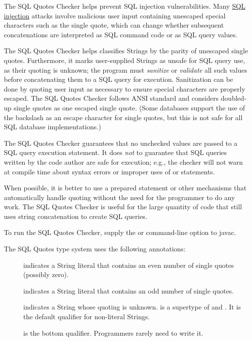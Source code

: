 \htmlhr
{}

The SQL Quotes Checker helps prevent SQL injection vulnerabilities. Many
\href{https://en.wikipedia.org/wiki/Sql_injection}{SQL injection} attacks
involve malicious user input containing unescaped special characters such as the
single quote, which can change whether subsequent concatenations are interpreted
as SQL command code or as SQL query values.

The SQL Quotes Checker helps classifies Strings by the parity of unescaped
single quotes.  Furthermore, it marks user-supplied Strings as unsafe for
SQL query use, as their quoting is unknown; the program must
\emph{sanitize} or \emph{validate} all such values before concatenating
them to a SQL query for execution. Sanitization can be done by quoting user
input as necessary to ensure special characters are properly escaped.  The
SQL Quotes Checker follows ANSI standard and considers doubled-up single
quotes as one escaped single quote.  (Some databases support the use of the
backslash as an escape character for single quotes, but this is not safe
for all SQL database implementations.)

The SQL Quotes Checker guarantees that no unchecked values are passed to a
SQL query execution statement.  It does \emph{not} to guarantee that SQL
queries written by the code author are safe for execution; e.g., the
checker will not warn at compile time about syntax errors or improper uses
of  or  statements.

When possible, it is better to use a prepared statement or other mechanisms
that automatically handle quoting without the need for the programmer to do
any work.  The SQL Quotes Checker is useful for the large quantity of code
that still uses string concatenation to create SQL queries.

To run the SQL Quotes Checker, supply the
or
command-line option to javac.



The SQL Quotes type system uses the following annotations:

\begin{description}
\item[]
    indicates a String literal that contains an even number of
    single quotes (possibly zero).
\item[]
    indicates a String literal that contains an odd number of single
    quotes.
\item[]
    indicates a String whose quoting is unknown.
     is a supertype of 
    and . It is the default qualifier for non-literal
    Strings.
\item[]
    is the bottom qualifier.  Programmers rarely need to write it.
\end{description}

